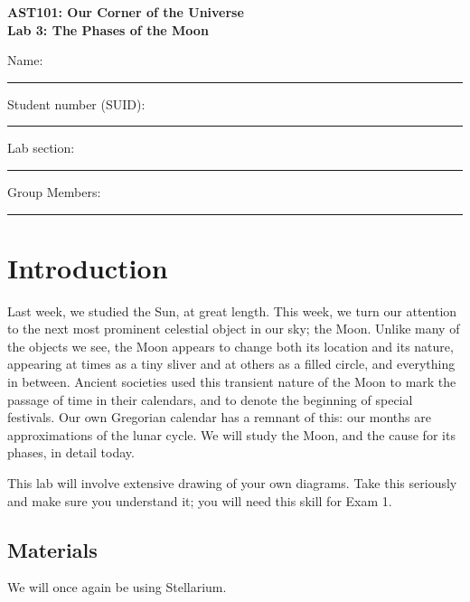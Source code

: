 \documentclass[11pt]{article}
\begin{document}
\begin{center}
\textbf{\Large
AST101: Our Corner of the Universe \\
\vspace*{0.1cm}
Lab 3: The Phases of the Moon
}
\end{center}

\vspace*{0.5cm}

{\Large Name:}\vspace*{0.5cm}\\\hrule
{\Large Student number (SUID):}\vspace*{0.5cm}\\\hrule
{\Large Lab section:}\vspace*{0.5cm}\\\hrule
{\Large Group Members:}\vspace*{0.5cm}\\\hrule
\vspace*{0.5cm}

\section{Introduction}

Last week, we studied the Sun, at great length. This week, we turn our attention to the next most prominent celestial object in our sky; the Moon. Unlike many of the objects we see, the Moon appears to change both its location and its nature, appearing at times as a tiny sliver and at others as a filled circle, and everything in between. Ancient societies used this transient nature of the Moon to mark the passage of time in their calendars, and to denote the beginning of special festivals. Our own Gregorian calendar has a remnant of this: our months are approximations of the lunar cycle. We will study the Moon, and the cause for its phases, in detail today. 

This lab will involve extensive drawing of your own diagrams. Take this seriously and make sure you understand it;
you will need this skill for Exam 1.

\subsection*{Materials}

We will once again be using Stellarium. 
\end{document}
